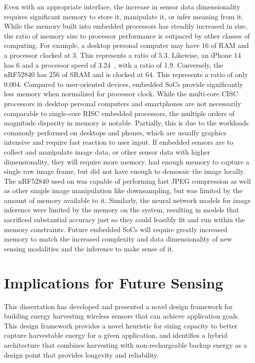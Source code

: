 Even with an appropriate interface, the increase in sensor data dimensionality requires significant memory to store it, manipulate it, or infer meaning from it.
While the memory built into embedded processors has steadily increased in size, the ratio of memory size to processor performance is outpaced by other classes of computing.
For example, a desktop personal computer may have 
16\ssi{\giga\byte} of RAM and a processor clocked at 3\ssi{\giga\hertz}. 
This represents a ratio of 5.3\ssi[per-mode=symbol]{\byte\per\hertz}.
Likewise, an iPhone 14 has 6\ssi{\giga\byte} and a processor speed of 3.24\ssi{\giga\hertz}~\cite{iphone14}, with a ratio of 1.9\ssi[per-mode=symbol]{\byte\per\hertz}.
Conversely, the nRF52840 
has 256\ssi{\kilo\byte} of SRAM and  
is clocked at 64\ssi{\mega\hertz}. This represents a ratio of only \num{0.004}\ssi[per-mode=symbol]{\byte\per\hertz}.
Compared to user-oriented devices, embedded SoCs provide significantly less memory when normalized for processor clock.
While the multi-core CISC processors in desktop personal computers and smartphones are not necessarily comparable to single-core RISC embedded processors, the multiple orders of magnitude disparity in memory is notable.
Partially, this is due to the workloads commonly performed on desktops and phones, which are usually graphics intensive and require fast reaction to user input.
If embedded sensors are to collect and manipulate image data, or other sensor data with higher dimensionality, they will require more memory.
\namec had enough memory to capture a single raw image frame, but did not have enough to demosaic the image locally.
The nRF52840 used on \namec was capable of performing fast JPEG compression as well as other simple image manipulation like downsampling, but was limited by the amount of memory available to it.
Similarly, the neural network models for image inference were limited by the memory on the system, resulting in models that sacrificed substantial accuracy just so they could feasibly fit and run within the memory constraints.
Future embedded SoCs will require greatly increased memory to match the increased complexity and data dimensionality of new sensing modalities and the inference to make sense of it.

\section{Implications for Future Sensing}
This dissertation has developed and presented a novel design framework for building energy harvesting wireless sensors that can achieve application goals. 
This design framework provides a novel heuristic for sizing capacity to better capture harvestable energy for a given application, and identifies a hybrid architecture that combines harvesting with non-rechargeable backup energy as a design point that provides longevity and reliability.

